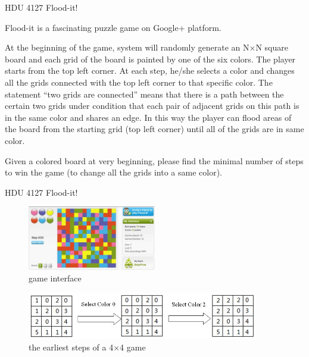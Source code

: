 \documentclass{beamer}
\begin{document}
\begin{frame}{HDU 4127 Flood-it!}

    Flood-it is a fascinating puzzle game on Google+ platform.
    
    At the beginning of the game, system will randomly generate an N×N square board and each grid of the board is painted by one of the six colors. The player starts from the top left corner. At each step, he/she selects a color and changes all the grids connected with the top left corner to that specific color. The statement “two grids are connected” means that there is a path between the certain two grids under condition that each pair of adjacent grids on this path is in the same color and shares an edge. In this way the player can flood areas of the board from the starting grid (top left corner) until all of the grids are in same color. 
    
    Given a colored board at very beginning, please find the minimal number of steps to win the game (to change all the grids into a same color). 
    
\end{frame}

\begin{frame}{HDU 4127 Flood-it!}

    \begin{figure}
        \centering
        \includegraphics[width=0.5\textwidth]{hdu4127-1.jpg}
        \caption{game interface}
    \end{figure}
    
    \begin{figure}
        \centering
        \includegraphics[width=0.9\textwidth]{hdu4127-2.jpg}
        \caption{the earliest steps of a 4×4 game}
    \end{figure}
    
\end{frame}
\end{document}
